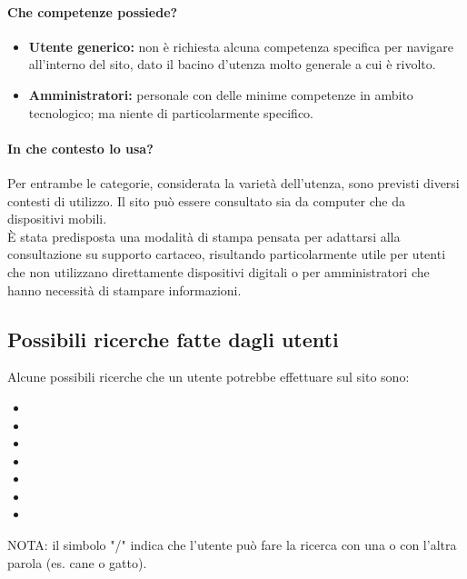 \paragraph{Che competenze possiede?}
\begin{itemize}
    \item \textbf{Utente generico:} non è richiesta alcuna competenza specifica per navigare all’interno del sito, dato il bacino d’utenza molto generale a cui è rivolto.
    \item \textbf{Amministratori:} personale con delle minime competenze in ambito tecnologico; ma niente di particolarmente specifico.
\end{itemize}

\paragraph{In che contesto lo usa?}
Per entrambe le categorie, considerata la varietà dell’utenza, sono previsti diversi contesti di utilizzo. Il sito può essere consultato sia da computer che da dispositivi mobili. \\ 
È stata predisposta una modalità di stampa pensata per adattarsi alla consultazione su supporto cartaceo, risultando particolarmente utile per utenti che non utilizzano direttamente dispositivi digitali o per  amministratori che hanno necessità di stampare informazioni.
\subsection{Possibili ricerche fatte dagli utenti}
Alcune possibili ricerche che un utente potrebbe effettuare sul sito sono:
\begin{itemize}
    \item {}
    \item {}
    \item {}
    \item {}
    \item {}
    \item {}
    \item {}
\end{itemize}
NOTA: il simbolo "/" indica che l'utente può fare la ricerca con una o con l'altra parola (es. cane o gatto). 
